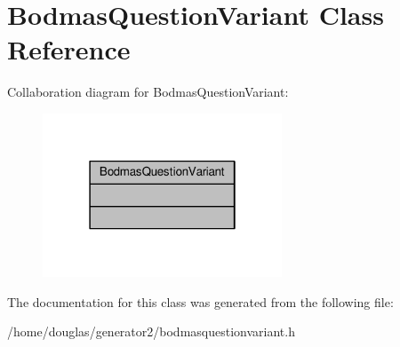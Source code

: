 \hypertarget{classBodmasQuestionVariant}{}\section{Bodmas\+Question\+Variant Class Reference}
\label{classBodmasQuestionVariant}


Collaboration diagram for Bodmas\+Question\+Variant\+:
\nopagebreak
\begin{figure}[H]
\begin{center}
\leavevmode
\includegraphics[width=202pt]{classBodmasQuestionVariant__coll__graph}
\end{center}
\end{figure}


The documentation for this class was generated from the following file\+:\begin{DoxyCompactItemize}
\item 
/home/douglas/generator2/bodmasquestionvariant.\+h\end{DoxyCompactItemize}
